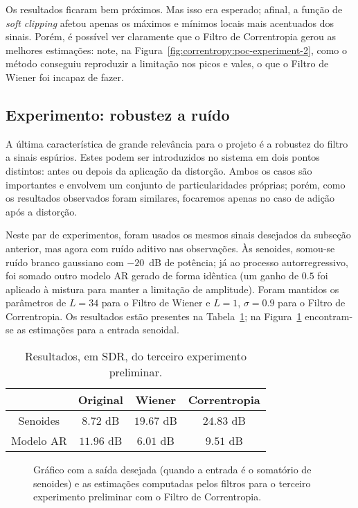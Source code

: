 Os resultados ficaram bem próximos. Mas isso era esperado; afinal, a função de
\textit{soft clipping} afetou apenas os máximos e mínimos locais mais acentuados dos
sinais. Porém, é possível ver claramente que o Filtro de Correntropia gerou as melhores
estimações: note, na Figura~\ref{fig:correntropy:poc-experiment-2}, como o método
conseguiu reproduzir a limitação nos picos e vales, o que o Filtro de Wiener foi
incapaz de fazer.

\subsection{Experimento: robustez a ruído}

A última característica de grande relevância para o projeto é a robustez do filtro a
sinais espúrios. Estes podem ser introduzidos no sistema em dois pontos distintos:
antes ou depois da aplicação da distorção. Ambos os casos são importantes e envolvem um
conjunto de particularidades próprias; porém, como os resultados observados foram
similares, focaremos apenas no caso de adição após a distorção.

Neste par de experimentos, foram usados os mesmos sinais desejados da subseção
anterior, mas agora com ruído aditivo nas observações. Às senoides, somou-se ruído
branco gaussiano com $-20$~dB de potência; já ao processo autorregressivo, foi somado
outro modelo AR gerado de forma idêntica (um ganho de $0.5$ foi aplicado à mistura para
manter a limitação de amplitude). Foram mantidos os parâmetros de $L = 34$ para o
Filtro de Wiener e $L = 1$, $\sigma = 0.9$ para o Filtro de Correntropia. Os resultados
estão presentes na Tabela~\ref{tab:correntropy:poc-experiment-3}; na
Figura~\ref{fig:correntropy:poc-experiment-3} encontram-se as estimações para a entrada
senoidal. {\def\arraystretch{1.25}\tabcolsep=10pt
		\begin{table}[!ht]
			\centering
			\caption[Resultados do terceiro experimento preliminar: robustez a ruído]{Resultados, em SDR, do terceiro experimento preliminar.}
			\label{tab:correntropy:poc-experiment-3}
			\begin{tabular}{cccc}
				\toprule
				          & Original   & Wiener     & Correntropia \\ \midrule
				Senoides  & $8.72$ dB  & $19.67$ dB & $24.83$ dB   \\
				Modelo AR & $11.96$ dB & $6.01$ dB  & $9.51$ dB    \\ \bottomrule
			\end{tabular}
		\end{table}
	}
\begin{figure}[!ht]
	\centering
	
	\caption[Saída desejada e estimações do terceiro experimento preliminar]{Gráfico com a saída desejada (quando a entrada é o somatório de senoides) e as estimações computadas pelos filtros para o terceiro experimento preliminar com o Filtro de Correntropia.}
	\label{fig:correntropy:poc-experiment-3}
\end{figure}

